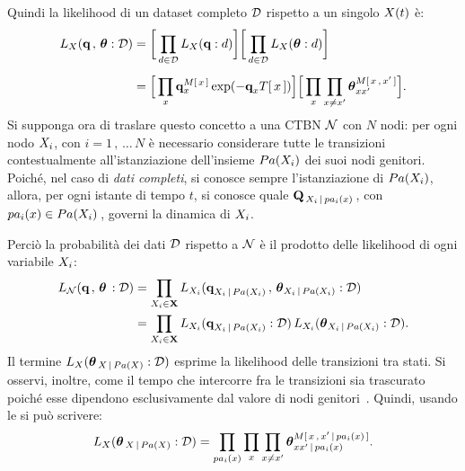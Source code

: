 Quindi la likelihood di un dataset completo $\mathcal{D}$ rispetto a un singolo \mprocess*{} \omog*{} $\mathnormal{X}(t)$ è:
\begin{equation}
\label{eq:ctbn-data-hmp-likelihood}
\begin{split}
L_{\setel{X}}(\param{q}\,,\,\param{$\theta$}:\conceptsym{D})&=\bigg[\prod_{d\in\conceptsym{D}}L_{\setel{X}}(\param{q}:d)\bigg]\bigg[\prod_{d\in\conceptsym{D}}L_{\setel{X}}(\param{$\theta$}:d)\bigg]\\[5pt]
&=\Big[\prod_{\setel{x}}\param{q}_{\setel{x}}^{\mstat{x}}\exp(-\param{q}_{\setel{x}}\tstat{x})\Big]\Big[\prod_{x}\prod_{x\neq x^{\prime}}\param{$\theta$}_{\setel{x}\setel{x}^{\prime}}^{\mstat[x]{\setel{x}^\prime}}\Big]\text{.}
\end{split}
\end{equation}
Si supponga ora di traslare questo concetto a una \acl{CTBN} $\mathcal{N}$ con $N$ nodi: per ogni nodo $\mathnormal{X_i}$, con $i=1\,,\,\dotsc\,N$ è necessario considerare tutte le transizioni contestualmente all'istanziazione dell'insieme $Pa(\mathnormal{X_i})$ dei suoi nodi genitori. Poiché, nel caso di \emph{dati completi}, si conosce sempre l'istanziazione di $Pa(\mathnormal{X_i})$, allora, per ogni istante di tempo $t$, si conosce quale \im*{} $\mathbf{Q}_{\,\mathnormal{X_i}\,\arrowvert\,pa_i(\mathnormal{x})}\,$, con $pa_i(\mathnormal{x})\in Pa(\mathnormal{X_i})\,$, governi la dinamica di $\mathnormal{X_i}$.

Perciò la probabilità dei dati $\mathcal{D}$ rispetto a $\mathcal{N}$ è il prodotto delle likelihood di ogni variabile $\mathnormal{X_i}$:
\begin{equation}
\begin{split}
L_{\mathcal{N}}(\boldsymbol{\textbf{\text{q}}}\,,\,\boldsymbol{\textbf{\text{$\theta$}}}\,:\mathcal{D})&=\prod_{\mathnormal{X}_i\in\mathbf{X}}L_{\mathnormal{X}_i}(\boldsymbol{\textbf{\text{q}}}_{\mathnormal{X}_i\,\arrowvert\,Pa(\mathnormal{X}_i)}\,,\,\boldsymbol{\textbf{\text{$\theta$}}}_{\mathnormal{X}_i\,\arrowvert\,Pa(\mathnormal{X}_i)}:\mathcal{D}) \\
&=\prod_{\mathnormal{X}_i\in\mathbf{X}}L_{\mathnormal{X}_i}(\boldsymbol{\textbf{\text{q}}}_{\mathnormal{X}_i\,\arrowvert\,Pa(\mathnormal{X}_i)}:\mathcal{D})\,L_{\mathnormal{X}_i}(\boldsymbol{\textbf{\text{$\theta$}}}_{\mathnormal{X}_i\,\arrowvert\,Pa(\mathnormal{X}_i)}:\mathcal{D})\text{.}
\end{split}
\end{equation}
Il termine $L_{\mathnormal{X}}(\boldsymbol{\textbf{\text{$\theta$}}}_{\,\mathnormal{X}\,\arrowvert\,Pa(\mathnormal{X})}:\mathcal{D})$ esprime la likelihood delle transizioni tra stati. Si osservi, inoltre, come il tempo che intercorre fra le transizioni sia trascurato poiché esse dipendono esclusivamente dal valore di nodi genitori~\citep[si veda][3]{Nodelman2002}. Quindi, usando le \emph{\stats{}} si può scrivere:
\[
L_{\setel{X}}(\param{$\theta$}_{\,\setel{X}\,\arrowvert\,Pa(\setel{X})}:\conceptsym{D})=\prod_{pa_i(\setel{x})} \prod_{x} \prod_{x\neq x^{\prime}}\param{$\theta$}_{xx^{\prime}\,\arrowvert\,pa_i(\setel{x})}^{\mstat[x]{\setel{x}^{\prime}\,\arrowvert\,pa_i(\setel{x})}}\text{.}
\]

